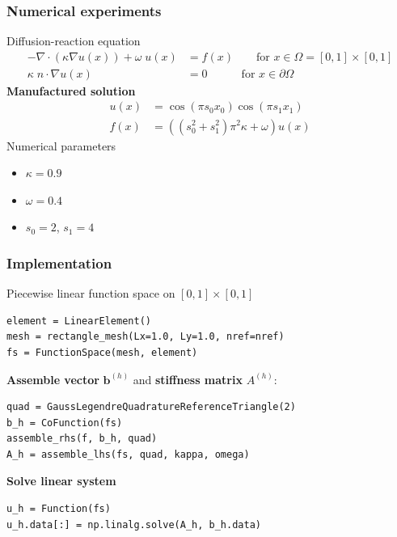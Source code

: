 \documentclass{beamer}
\begin{document}

\begin{frame}[fragile]
  \frametitle{Numerical experiments}
Diffusion-reaction equation
  $$
\begin{aligned}
  -\nabla \cdot (\kappa \nabla  u(x)) + \omega\; u(x) &= f(x) \qquad \text{for $x\in \Omega=[0,1]\times[0,1]$}\\
  \kappa\; n\cdot \nabla u(x)&=0 \qquad\quad \text{for $x\in\partial \Omega$}
\end{aligned}
$$
\textbf{Manufactured solution}
$$
\begin{aligned}
u(x) &= \cos(\pi s_0 x_0) \cos(\pi s_1 x_1)\\
f(x) &= \left((s_0^2 + s_1^2) \pi^2 \kappa + \omega\right)u(x)
\end{aligned}
$$
Numerical parameters
\begin{itemize}
\item $\kappa = 0.9$
\item $\omega = 0.4$
\item $s_0=2$, $s_1=4$
\end{itemize}
\end{frame}


\begin{frame}[fragile]
  \frametitle{Implementation}
  Piecewise linear function space on $[0,1]\times[0,1]$
  \begin{lstlisting}
element = LinearElement()
mesh = rectangle_mesh(Lx=1.0, Ly=1.0, nref=nref)
fs = FunctionSpace(mesh, element)
  \end{lstlisting}
  \textbf{Assemble vector} $\boldsymbol{b}^{(h)}$ and \textbf{stiffness matrix} $A^{(h)}$:
  \begin{lstlisting}
quad = GaussLegendreQuadratureReferenceTriangle(2)
b_h = CoFunction(fs)
assemble_rhs(f, b_h, quad)
A_h = assemble_lhs(fs, quad, kappa, omega)
  \end{lstlisting}
  \textbf{Solve linear system}
  \begin{lstlisting}
u_h = Function(fs)
u_h.data[:] = np.linalg.solve(A_h, b_h.data)
  \end{lstlisting}
\end{frame}

\end{document}
